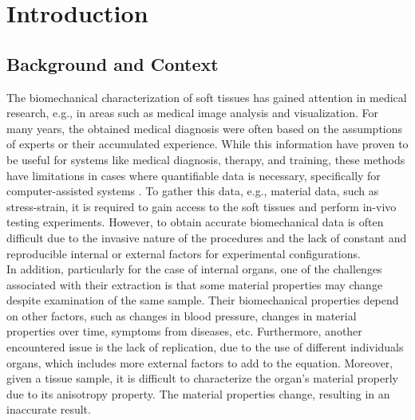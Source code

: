 
\chapter{Introduction} %

\label{Chapter2} %

\section{Background and Context}
The biomechanical characterization of soft tissues has gained attention
in medical research, e.g., in areas such as medical image analysis and visualization.
For many years, the obtained medical diagnosis were often based on the assumptions of experts or 
their accumulated experience. While this information have proven to be useful for systems like
medical diagnosis, therapy, and training, these methods have limitations 
in cases where quantifiable data is necessary, specifically for computer-assisted systems \cite{Kauer2002}.
To gather this data, e.g., material data, such as stress-strain, it is required 
to gain access to the soft tissues and perform in-vivo testing experiments. 
However, to obtain accurate biomechanical data is often difficult 
due to the invasive nature of the procedures and the lack of constant and reproducible internal or external factors for 
experimental configurations.\\


In addition, particularly for the case of internal organs, one of the challenges associated with their extraction 
is that some material properties may change despite examination of the same sample. Their biomechanical properties 
depend on other factors, such as changes in blood pressure, changes in material properties 
over time, symptoms from diseases, etc. Furthermore, another encountered issue is the lack 
of replication, due to the use of different individuals organs, which includes more external
 factors to add to the equation. Moreover, given a tissue sample, it is difficult to 
 characterize the organ's material properly due to its anisotropy property. The material 
 properties change, resulting in an inaccurate result.
\\

